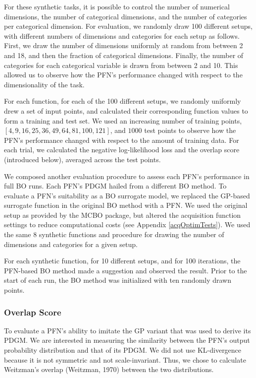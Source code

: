 \documentclass[12pt,twoside]{reedthesis}
\begin{document}
For these synthetic tasks, it is possible to control the number of numerical dimensions, the number of categorical dimensions, and the number of categories per categorical dimension. For evaluation, we randomly draw 100 different setups, with different numbers of dimensions and categories for each setup as follows. First, we draw the number of dimensions uniformly at random from between 2 and 18, and then the fraction of categorical dimensions. Finally, the number of categories for each categorical variable is drawn from between 2 and 10. This allowed us to observe how the PFN's performance changed with respect to the dimensionality of the task.

For each function, for each of the 100 different setups, we randomly uniformly drew a set of input points, and calculated their corresponding function values to form a training and test set. We used an increasing number of training points, \([4,9,16,25,36,49,64,81,100,121]\), and \(1000\) test points to observe how the PFN's performance changed with respect to the amount of training data. For each trial, we calculated the negative log-likelihood loss and the overlap score (introduced below), averaged across the test points.

We composed another evaluation procedure to assess each PFN's performance in full BO runs. Each PFN's PDGM hailed from a different BO method. To evaluate a PFN's suitability as a BO surrogate model, we replaced the GP-based surrogate function in the original BO method with a PFN. We used the original setup as provided by the MCBO package, but altered the acquisition function settings to reduce computational costs (see Appendix \ref{acqOptimTests}). We used the same 8 synthetic functions and procedure for drawing the number of dimensions and categories for a given setup.

For each synthetic function, for 10 different setups, and for 100 iterations, the PFN-based BO method made a suggestion and observed the result. Prior to the start of each run, the BO method was initialized with ten randomly drawn points.

\hypertarget{overlap-score}{%
\subsubsection{Overlap Score}\label{overlap-score}}

To evaluate a PFN's ability to imitate the GP variant that was used to derive its PDGM. We are interested in measuring the similarity between the PFN's output probability distribution and that of its PDGM. We did not use KL-divergence because it is not symmetric and not scale-invariant. Thus, we chose to calculate Weitzman's overlap (Weitzman, 1970) between the two distributions.
\end{document}
